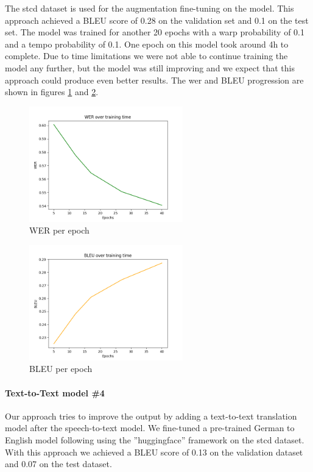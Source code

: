 The \gls{stcd} dataset is used for the augmentation fine-tuning on the  model. This approach achieved a BLEU score of 0.28 on the validation set and 0.1 on the test set. The model was trained for another
20 epochs with a warp probability of 0.1 and a tempo probability of 0.1. One epoch on this model took around 4h to complete. Due to time limitations we
were not able to continue training the model any further, but the model was still improving and we expect that this approach could produce even better results. The \gls{wer} and BLEU progression are shown in figures \ref{fig:WER} and  \ref{fig:BLEU}.
\begin{figure}[t]
    \includegraphics[width=\linewidth,height=5cm]{img/WER.png}
    \caption{WER per epoch}
    \label{fig:WER}
\end{figure}
\begin{figure}[t]
    \includegraphics[width=\linewidth,height=5cm]{img/BLEU.png}
    \caption{BLEU per epoch}
    \label{fig:BLEU}
\end{figure}

\paragraph{Text-to-Text model \#4} Our  approach tries to improve the output by adding a text-to-text translation model after the speech-to-text model. We fine-tuned a pre-trained German to
English model following  using the ''huggingface'' framework \cite{wolf-etal-2020-transformers} on the \gls{stcd} dataset. With this approach we achieved a BLEU score of 0.13 on the validation dataset and
0.07 on the test dataset.
